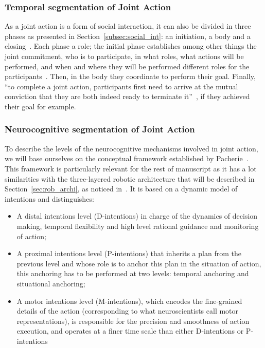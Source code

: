 \documentclass[a4paper,11pt,twoside]{StyleThese}
\begin{document}
\subsubsection{Temporal segmentation of Joint Action}
As a joint action is a form of social interaction, it can also be divided in three phases as presented in Section~\ref{subsec:social_int}: an initiation, a body and a closing~\cite{heesen_2017_social}. Each phase a role; the initial phase establishes among other things the joint commitment, \ie who is to participate, in what roles, what actions will be performed, and when and where they will be performed different roles for the participants~\cite{clark_2006_social}. Then, in the body they coordinate to perform their goal. Finally, ``to complete a joint action, participants first need to arrive at the mutual conviction that they are both indeed ready to terminate it''~\cite{heesen_2017_social}, if they achieved their goal for example.

\subsubsection{Neurocognitive segmentation of Joint Action}

To describe the levels of the neurocognitive mechanisms involved in joint action, we will base ourselves on the conceptual framework established by Pacherie~\cite{pacherie_2008_phenomenology}. This framework is particularly relevant for the rest of manuscript as it has a lot similarities with the three-layered robotic architecture that will be described in Section~\ref{sec:rob_archi}, as noticed in~\cite{clodic_2017_key}. It is based on a dynamic model of intentions and distinguishes:

\begin{itemize}
	\item A distal intentions level (D-intentions) in charge of the dynamics of decision making, temporal flexibility and high level rational guidance and monitoring of action;
	\item A proximal intentions level (P-intentions) that inherits a plan from the previous level and whose role is to anchor this plan in the situation of action, this anchoring has to be performed at two levels: temporal anchoring and situational anchoring;
	\item A motor intentions level (M-intentions), which encodes the fine-grained details of the action (corresponding to what neuroscientists call motor representations), is responsible for the precision and smoothness of action execution, and operates at a finer time scale than either D-intentions or P-intentions
\end{itemize}
\end{document}
